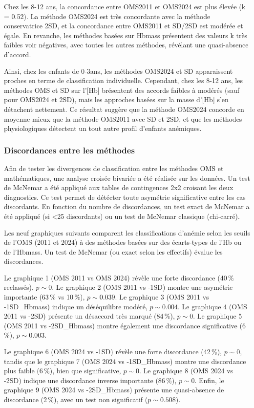 \documentclass[12pt,a4paper]{article}
\begin{document}
Chez les 8-12 ans, la concordance entre OMS2011 et OMS2024 est plus élevée (k = 0.52). La méthode OMS2024 est très concordante avec la méthode conservatrice 2SD, et la concordance entre OMS2011 et SD/2SD est modérée et égale. En revanche, les méthodes basées sur Hbmass présentent des valeurs k très faibles voir négatives, avec toutes les autres méthodes, révélant une quasi-absence d'accord.

Ainsi, chez les enfants de 0-3ans, les méthodes OMS2024 et SD apparaissent proches en terme de classification individuelle. Cependant, chez les 8-12 ans, les méthodes OMS et SD sur l'[Hb] brésentent des accords faibles à modérés (sauf pour OMS2024 et 2SD), mais les approches basées sur la masse d'[Hb] s'en détachent nettement. Ce résultat suggère que la méthode OMS2024 concorde en moyenne mieux que la méthode OMS2011 avec SD et 2SD, et que les méthodes physiologiques détectent un tout autre profil d'enfants anémiques.

\subsubsection{Discordances entre les méthodes}

Afin de tester les divergences de classification entre les méthodes OMS et mathématiques, une analyse croisée bivariée a été réalisée sur les données. Un test de McNemar a été appliqué aux tables de contingences 2x2 croisant les deux diagnostics. Ce test permet de détécter toute asymétrie significative entre les cas discordants. En fonction du nombre de discordances, un test exact de McNemar a été appliqué (si <25 discordants) ou un test de McNemar classique (chi-carré).

Les neuf graphiques suivants comparent les classifications d’anémie selon les seuils de l’OMS (2011 et 2024) à des méthodes basées sur des écarts-types de l’Hb ou de l’Hbmass. Un test de McNemar (ou exact selon les effectifs) évalue les discordances.

Le graphique 1 (OMS 2011 vs OMS 2024) révèle une forte discordance (40\,\% reclassés), $p \sim 0$. Le graphique 2 (OMS 2011 vs -1SD) montre une asymétrie importante (63\,\% vs 10\,\%), $p \sim 0.039$. Le graphique 3 (OMS 2011 vs -1SD\_Hbmass) indique un déséquilibre modéré, $p \sim 0.004$. Le graphique 4 (OMS 2011 vs -2SD) présente un désaccord très marqué (84\,\%), $p \sim 0$. Le graphique 5 (OMS 2011 vs -2SD\_Hbmass) montre également une discordance significative (6\,\%), $p \sim 0.003$.

Le graphique 6 (OMS 2024 vs -1SD) révèle une forte discordance (42\,\%), $p \sim 0$, tandis que le graphique 7 (OMS 2024 vs -1SD\_Hbmass) montre une discordance plus faible (6\,\%), bien que significative, $p \sim 0$. Le graphique 8 (OMS 2024 vs -2SD) indique une discordance inverse importante (86\,\%), $p \sim 0$. Enfin, le graphique 9 (OMS 2024 vs -2SD\_Hbmass) présente une quasi-absence de discordance (2\,\%), avec un test non significatif ($p \sim 0.508$).
\end{document}
